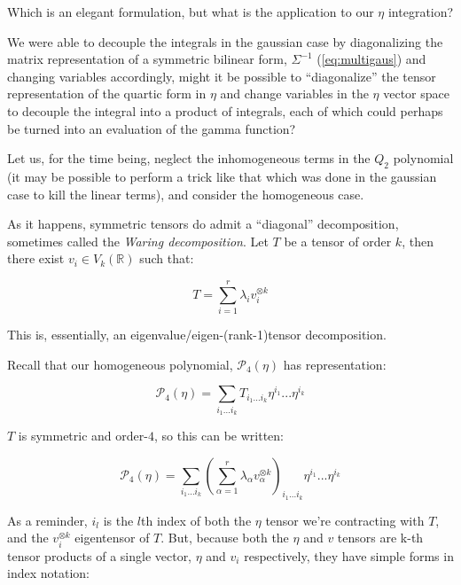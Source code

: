 \documentclass[10pt,letterpaper]{article}
\begin{document}
Which is an elegant formulation, but what is the application to our $\eta$ integration?

We were able to decouple the integrals in the gaussian case by diagonalizing the matrix representation of a symmetric bilinear form, $\Sigma^{-1}$ (\ref{eq:multigaus}) and changing variables accordingly, might it be possible to ``diagonalize'' the tensor representation of the quartic form in $\eta$ and change variables in the $\eta$ vector space to decouple the integral into a product of integrals, each of which could perhaps be turned into an evaluation of the gamma function?

Let us, for the time being, neglect the inhomogeneous terms in the $Q_2$ polynomial (it may be possible to perform a trick like that which was done in the gaussian case to kill the linear terms), and consider the homogeneous case.

As it happens, symmetric tensors do admit a ``diagonal'' decomposition, sometimes called the \textit{Waring decomposition}. Let $T$ be a tensor of order $k$, then there exist $v_i\in V_k(\mathbb{R})$ such that:

\begin{equation} \label{eq:waring}
T = \sum_{i=1}^r \lambda_i v_i^{\otimes k}
\end{equation} 

This is, essentially, an eigenvalue/eigen-(rank-1)tensor decomposition.

Recall that our homogeneous polynomial, $\mathcal{P}_4(\eta)$ has representation:

\begin{equation} \label{eq:etaform}
\mathcal{P}_4(\eta) =  \sum_{i_1...i_k} T_{i_1...i_k} \eta^{i_1}...\eta^{i_k}
\end{equation}

$T$ is symmetric and order-$4$, so this can be written:

\begin{equation} \label{eq:etaform_eigen}
\mathcal{P}_4(\eta) =  \sum_{i_1...i_k} \left(\sum_{\alpha=1}^r \lambda_{\alpha} v_{\alpha}^{\otimes k}\right)_{i_1...i_k} \eta^{i_1}...\eta^{i_k}
\end{equation}

As a reminder, $i_l$ is the $l$th index of both the $\eta$ tensor we're contracting with $T$, and the $v_i^{\otimes k}$ eigentensor of $T$. But, because both the $\eta$ and $v$ tensors are k-th tensor products of a single vector, $\eta$ and $v_i$ respectively, they have simple forms in index notation:
\end{document}
